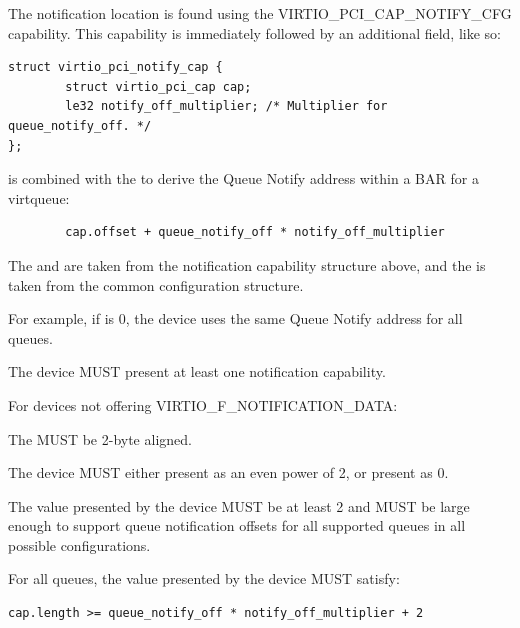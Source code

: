 The notification location is found using the VIRTIO_PCI_CAP_NOTIFY_CFG
capability.  This capability is immediately followed by an additional
field, like so:

\begin{lstlisting}
struct virtio_pci_notify_cap {
        struct virtio_pci_cap cap;
        le32 notify_off_multiplier; /* Multiplier for queue_notify_off. */
};
\end{lstlisting}

 is combined with the  to
derive the Queue Notify address within a BAR for a virtqueue:

\begin{lstlisting}
        cap.offset + queue_notify_off * notify_off_multiplier
\end{lstlisting}

The  and  are taken from the
notification capability structure above, and the  is
taken from the common configuration structure.

\begin{note}
For example, if  is 0, the device uses
the same Queue Notify address for all queues.
\end{note}

The device MUST present at least one notification capability.

For devices not offering VIRTIO_F_NOTIFICATION_DATA:

The  MUST be 2-byte aligned.

The device MUST either present  as an even power of 2,
or present  as 0.

The value  presented by the device MUST be at least 2
and MUST be large enough to support queue notification offsets
for all supported queues in all possible configurations.

For all queues, the value  presented by the device MUST satisfy:
\begin{lstlisting}
cap.length >= queue_notify_off * notify_off_multiplier + 2
\end{lstlisting}

